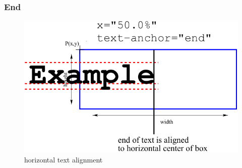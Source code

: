 \clearpage

\subsubsection{End}

\begin{figure}[h!]
\begin{center}
\includegraphics{figures/HorizontalTextPlacement_End.pdf}
\end{center}
\caption{horizontal text alignment }
\label{HorizontalTextPlacement_End}
\end{figure}

